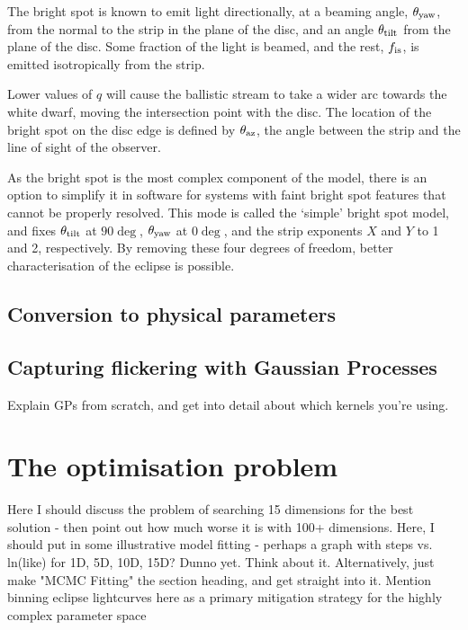 The bright spot is known to emit light directionally, at a beaming angle, $\theta_{\rm yaw}$, from the normal to the strip in the plane of the disc, and an angle $\theta_{\rm tilt}$ from the plane of the disc. 
Some fraction of the light is beamed, and the rest, $f_{\rm is}$, is emitted isotropically from the strip. 

Lower values of $q$ will cause the ballistic stream to take a wider arc towards the white dwarf, moving the intersection point with the disc. The location of the bright spot on the disc edge is defined by $\theta_{\rm az}$, the angle between the strip and the line of sight of the observer.

As the bright spot is the most complex component of the model, there is an option to simplify it in software for systems with faint bright spot features that cannot be properly resolved.
This mode is called the `simple' bright spot model, and fixes $\theta_{\rm tilt}$ at $90\deg$, $\theta_{\rm yaw}$ at $0\deg$, and the strip exponents $X$ and $Y$ to 1 and 2, respectively. By removing these four degrees of freedom, better characterisation of the eclipse is possible.

\subsection{Conversion to physical parameters}






\subsection{Capturing flickering with Gaussian Processes}
Explain GPs from scratch, and get into detail about which kernels you're using. 


\section{The optimisation problem}
Here I should discuss the problem of searching 15 dimensions for the best solution - then point out how much worse it is with 100+ dimensions. Here, I should put in some illustrative model fitting - perhaps a graph with steps vs. ln(like) for 1D, 5D, 10D, 15D? Dunno yet. Think about it. Alternatively, just make "MCMC Fitting" the section heading, and get straight into it. Mention binning eclipse lightcurves here as a primary mitigation strategy for the highly complex parameter space


